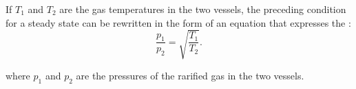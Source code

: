 If $T_{1}$ and $T_{2}$ are the gas temperatures in the two vessels, the preceding condition for a steady state can be rewritten in the form of an equation that expresses the :
\begin{equation*}%
\frac{p_{1}}{p_{2}} = \sqrt{\frac{T_{1}}{T_{2}}}.
\end{equation*}

where $p_{1}$ and $p_{2}$ are the pressures of the rarified gas in the two vessels.
